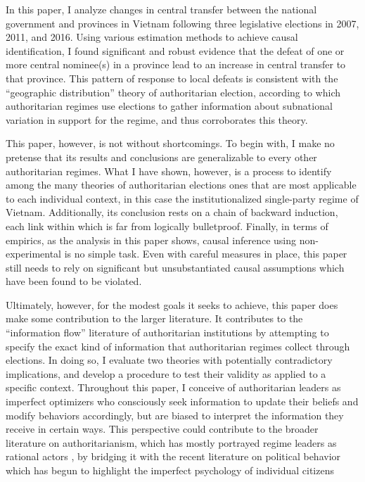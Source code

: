 \documentclass[12pt]{article}\usepackage[]{graphicx}\usepackage[]{color}
\newcommand{\1}{\mathbbm{1}}
\begin{document}
In this paper, I analyze changes in central transfer between the national government and provinces in Vietnam following three legislative elections in 2007, 2011, and 2016. Using various estimation methods to achieve causal identification, I found significant and robust evidence that the defeat of one or more central nominee(s) in a province lead to an increase in central transfer to that province. This pattern of response to local defeats is consistent with the ``geographic distribution'' theory of authoritarian election, according to which authoritarian regimes use elections to gather information about subnational variation in support for the regime, and thus corroborates this theory.

This paper, however, is not without shortcomings. To begin with, I make no pretense that its results and conclusions are generalizable to every other authoritarian regimes. What I have shown, however, is a process to identify among the many theories of authoritarian elections ones that are most applicable to each individual context, in this case the institutionalized single-party regime of Vietnam. Additionally, its conclusion rests on a chain of backward induction, each link within which is far from logically bulletproof. Finally, in terms of empirics, as the analysis in this paper shows, causal inference using non-experimental is no simple task. Even with careful measures in place, this paper still needs to rely on significant but unsubstantiated causal assumptions which have been found to be violated. 

Ultimately, however, for the modest goals it seeks to achieve, this paper does make some contribution to the larger literature. It contributes to the ``information flow'' literature of authoritarian institutions by attempting to specify the exact kind of information that authoritarian regimes collect through elections. In doing so, I evaluate two theories with potentially contradictory implications, and develop a procedure to test their validity as applied to a specific context. Throughout this paper, I conceive of authoritarian leaders as imperfect optimizers who consciously seek information to update their beliefs and modify behaviors accordingly, but are biased to interpret the information they receive in certain ways. This perspective could contribute to the broader literature on authoritarianism, which has mostly portrayed regime leaders as rational actors \citep[e.g.][]{AR2001}, by bridging it with the recent literature on political behavior which has begun to highlight the imperfect psychology of individual citizens \citep[e.g.][]{AchenBartels2016}




\end{document}
